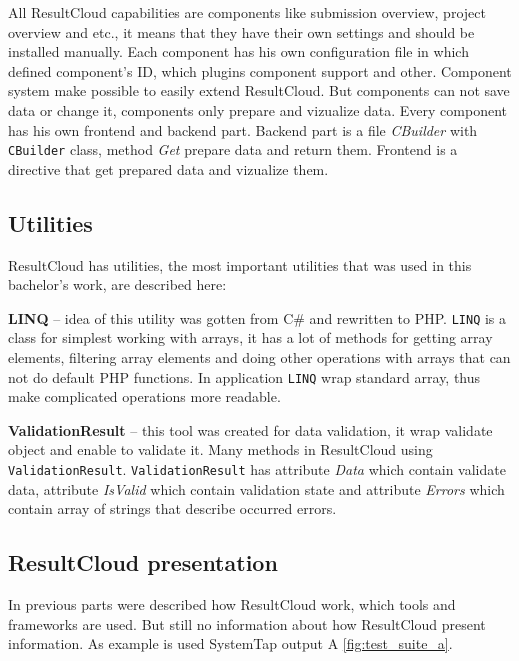 All ResultCloud capabilities are components like submission overview, project overview and etc., it means that they have their own settings and should be installed manually. Each component has his own configuration file in which defined component's ID, which plugins component support and other. Component system make possible to easily extend ResultCloud. But components can not save data or change it, components only prepare and vizualize data. Every component has his own frontend and backend part. Backend part is a file \emph{CBuilder} with \texttt{CBuilder} class, method \emph{Get} prepare data and return them. Frontend is a directive that get prepared data and vizualize them.   

\subsection{Utilities}

ResultCloud has utilities, the most important utilities that was used in this bachelor's work, are described here:

\textbf{LINQ} -- idea of this utility was gotten from C\# and rewritten to PHP. \texttt{LINQ} is a class for simplest working with arrays, it has a lot of methods for getting array elements, filtering array elements and doing other operations with arrays that can not do default PHP functions. In application \texttt{LINQ} wrap standard array, thus make complicated operations more readable.  

\textbf{ValidationResult} -- this tool was created for data validation, it wrap validate object and enable to validate it. Many methods in ResultCloud using \texttt{ValidationResult}. \texttt{ValidationResult} has attribute \emph{Data} which contain validate data, attribute \emph{IsValid} which contain validation state and attribute \emph{Errors} which contain array of strings that describe occurred errors.

\subsection{ResultCloud presentation}

In previous parts were described how ResultCloud work, which tools and frameworks are used. But still no information about how ResultCloud present information. As example is used SystemTap output A \ref{fig:test_suite_a}.

